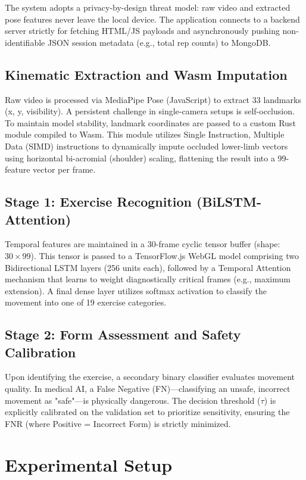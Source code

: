 \documentclass[conference]{IEEEtran}
\begin{document}
The system adopts a privacy-by-design threat model: raw video and extracted pose features never leave the local device. The application connects to a backend server strictly for fetching HTML/JS payloads and asynchronously pushing non-identifiable JSON session metadata (e.g., total rep counts) to MongoDB. 

\subsection{Kinematic Extraction and Wasm Imputation}
Raw video is processed via MediaPipe Pose (JavaScript) to extract 33 landmarks (x, y, visibility). A persistent challenge in single-camera setups is self-occlusion. To maintain model stability, landmark coordinates are passed to a custom Rust module compiled to Wasm. This module utilizes Single Instruction, Multiple Data (SIMD) instructions to dynamically impute occluded lower-limb vectors using horizontal bi-acromial (shoulder) scaling, flattening the result into a 99-feature vector per frame.

\subsection{Stage 1: Exercise Recognition (BiLSTM-Attention)}
Temporal features are maintained in a 30-frame cyclic tensor buffer (shape: $30 \times 99$). This tensor is passed to a TensorFlow.js WebGL model comprising two Bidirectional LSTM layers (256 units each), followed by a Temporal Attention mechanism that learns to weight diagnostically critical frames (e.g., maximum extension). A final dense layer utilizes softmax activation to classify the movement into one of 19 exercise categories.

\subsection{Stage 2: Form Assessment and Safety Calibration}
Upon identifying the exercise, a secondary binary classifier evaluates movement quality. In medical AI, a False Negative (FN)---classifying an unsafe, incorrect movement as "safe"---is physically dangerous. The decision threshold ($\tau$) is explicitly calibrated on the validation set to prioritize sensitivity, ensuring the FNR (where Positive = Incorrect Form) is strictly minimized.

\section{Experimental Setup}
\end{document}
